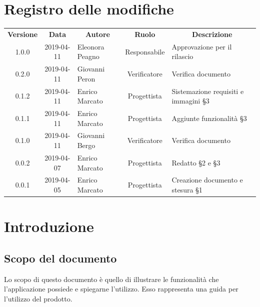 \documentclass[11pt,a4paper]{article}
\begin{document}
	
	
	{\def\arraystretch{2}\tabcolsep=10pt
	\newpage
	\section*{\centering Registro delle modifiche}
	\begin{tabularx}{\textwidth}{ c | c | p{3.80cm} | c | X }
		\rowcolor{LightBlue}
		\color{white}\bfseries Versione & \color{white}\bfseries Data & \multicolumn{1}{c}{\color{white}\bfseries Autore}
		& \color{white}\bfseries Ruolo & \multicolumn{1}{c}{\color{white}\bfseries Descrizione}\\[0.25cm]
		1.0.0 & 2019-04-11 & Eleonora Peagno & Responsabile & Approvazione per il \newline rilascio \\ \hline
		0.2.0 & 2019-04-11 & Giovanni Peron & Verificatore & Verifica documento \\ \hline
		0.1.2 & 2019-04-11 & Enrico Marcato & Progettista & Sistemazione requisiti e immagini \S3 \\ \hline
		0.1.1 & 2019-04-11 & Enrico Marcato & Progettista & Aggiunte funzionalità \S3  \\ \hline
		0.1.0 & 2019-04-11 & Giovanni Bergo & Verificatore & Verifica documento \\ \hline
		0.0.2 & 2019-04-07 & Enrico Marcato & Progettista & Redatto \S2 e \S3 \\ \hline
		0.0.1 & 2019-04-05 & Enrico Marcato & Progettista & Creazione documento e stesura \S1 \\ 
	 \hline		
	\end{tabularx}
	
	\newpage	
	
	\renewcommand  \contentsname {\Large Indice} 
	
	\tableofcontents
	\newpage
	\listoffigures

	\newpage
	
	\section{Introduzione}
	\subsection{Scopo del documento}
	Lo scopo di questo documento è quello di illustrare le funzionalità che l'applicazione possiede e spiegarne l'utilizzo. Esso rappresenta una guida per l'utilizzo del prodotto.
}
\end{document}
